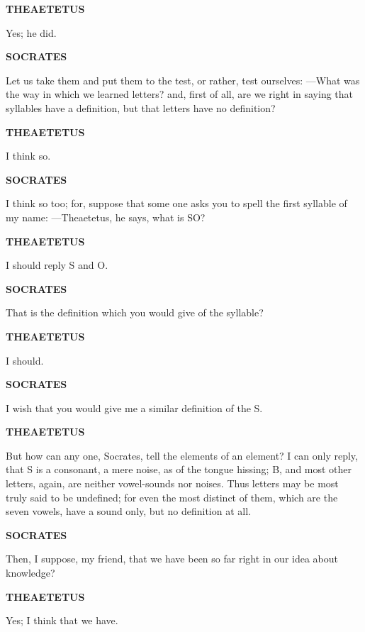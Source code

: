 \documentclass[11pt,letter]{article}
\begin{document}
\par \textbf{THEAETETUS}
\par   Yes; he did.

\par \textbf{SOCRATES}
\par   Let us take them and put them to the test, or rather, test ourselves: —What was the way in which we learned letters? and, first of all, are we right in saying that syllables have a definition, but that letters have no definition?

\par \textbf{THEAETETUS}
\par   I think so.

\par \textbf{SOCRATES}
\par   I think so too; for, suppose that some one asks you to spell the first syllable of my name: —Theaetetus, he says, what is SO?

\par \textbf{THEAETETUS}
\par   I should reply S and O.

\par \textbf{SOCRATES}
\par   That is the definition which you would give of the syllable?

\par \textbf{THEAETETUS}
\par   I should.

\par \textbf{SOCRATES}
\par   I wish that you would give me a similar definition of the S.

\par \textbf{THEAETETUS}
\par   But how can any one, Socrates, tell the elements of an element? I can only reply, that S is a consonant, a mere noise, as of the tongue hissing; B, and most other letters, again, are neither vowel-sounds nor noises. Thus letters may be most truly said to be undefined; for even the most distinct of them, which are the seven vowels, have a sound only, but no definition at all.

\par \textbf{SOCRATES}
\par   Then, I suppose, my friend, that we have been so far right in our idea about knowledge?

\par \textbf{THEAETETUS}
\par   Yes; I think that we have.
\end{document}
